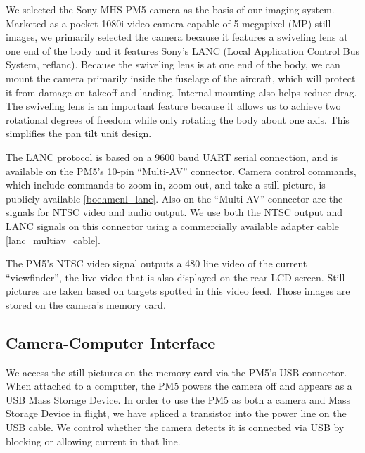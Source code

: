 \documentclass[10pt]{report}
\begin{document}
We selected the Sony MHS-PM5 camera as the basis of our imaging system. Marketed as a pocket 1080i video camera capable of 5 megapixel (MP) still images, we primarily selected the camera because it features a swiveling lens at one end of the body and it features Sony's LANC (Local Application Control Bus System, ref{lanc}). Because the swiveling lens is at one end of the body, we can mount the camera primarily inside the fuselage of the aircraft, which will protect it from damage on takeoff and landing. Internal mounting also helps reduce drag. The swiveling lens is an important feature because it allows us to achieve two rotational degrees of freedom while only rotating the body about one axis. This simplifies the pan tilt unit design.

The LANC protocol is based on a 9600 baud UART serial connection, and is available on the PM5's 10-pin ``Multi-AV'' connector. Camera control commands, which include commands to zoom in, zoom out, and take a still picture, is publicly available \ref{boehmenl_lanc}. Also on the ``Multi-AV'' connector are the signals for NTSC video and audio output. We use both the NTSC output and LANC signals on this connector using a commercially available adapter cable \ref{lanc_multiav_cable}.


The PM5's NTSC video signal outputs a 480 line video of the current ``viewfinder'', the live video that is also displayed on the rear LCD screen. 
Still pictures are taken based on targets spotted in this video feed. Those images are stored on the camera's memory card.

\subsection{Camera-Computer Interface}

We access the still pictures on the memory card via the PM5's USB connector. When attached to a computer, the PM5 powers the camera off and appears as a USB Mass Storage Device. In order to use the PM5 as both a camera and Mass Storage Device in flight, we have spliced a transistor into the power line on the USB cable. We control whether the camera detects it is connected via USB by blocking or allowing current in that line. 

\end{document}
